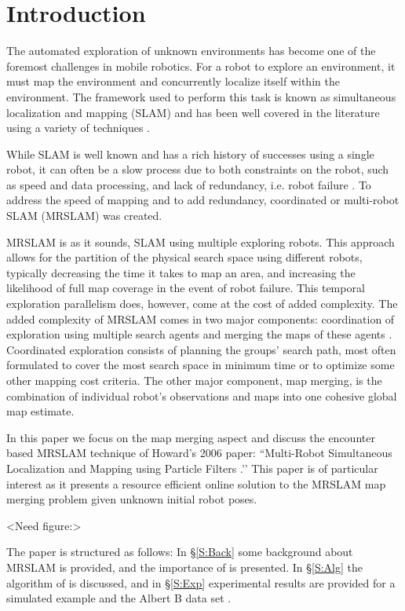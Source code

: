 \section{Introduction}
\label{S:Intro}


The automated exploration of unknown environments has become one of the foremost challenges in mobile robotics. For a robot to explore an environment, it must map the environment and concurrently localize itself within the environment.  The framework used to perform this task is known as simultaneous localization and mapping (SLAM) and has been well covered in the literature using a variety of techniques \cite{durrant2006simultaneous,bailey2006simultaneous}.

While SLAM is well known and has a rich history of successes using a single robot, it can often be a slow process due to both constraints on the robot, such as speed and data processing, and lack of redundancy, i.e. robot failure \cite{thrun2001probabilistic,burgard2005coordinated}.  To address the speed of mapping and to add redundancy, coordinated or multi-robot SLAM (MRSLAM) was created.

MRSLAM is as it sounds, SLAM using multiple exploring robots. This approach allows for the partition of the physical search space using different robots, typically decreasing the time it takes to map an area, and increasing the likelihood of full map coverage in the event of robot failure. This temporal exploration parallelism does, however, come at the cost of added complexity. The added complexity of MRSLAM comes in two major components: coordination of exploration using multiple search agents and merging the maps of these agents \cite{fox2006distributed}.  Coordinated exploration consists of planning the groups' search path, most often formulated to cover the most search space in minimum time or to optimize some other mapping cost criteria. The other major component, map merging, is the combination of individual robot's observations and maps into one cohesive global map estimate.

In this paper we focus on the map merging aspect and discuss the encounter based MRSLAM technique of Howard's 2006 paper: ``Multi-Robot Simultaneous Localization and Mapping using Particle Filters \cite{howard2006multi}.’’ This paper is of particular interest as it presents a resource efficient online solution to the MRSLAM map merging problem given unknown initial robot poses. 

<Need figure:>

The paper is structured as follows: In \S\ref{S:Back} some background about MRSLAM is provided, and the importance of \cite{howard2006multi} is presented.  In \S\ref{S:Alg} the algorithm of \cite{howard2006multi} is discussed, and in \S\ref{S:Exp} experimental results are provided for a simulated example and the Albert B data set \cite{Radish}.

